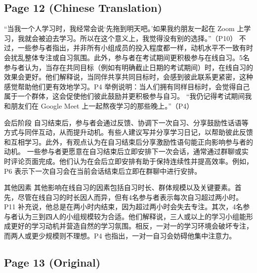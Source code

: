 \documentclass[12pt]{ctexart}
\begin{document}
\subsection*{Page 12 (Chinese Translation)}

“当我一个人学习时，我经常会说‘先拖到明天吧。’如果我约朋友一起在 Zoom 上学习，我就会被迫去学习。所以在这个意义上，我觉得没有别的选择。”（P10）
不过，一些参与者指出，并非所有小组成员的投入程度都一样，动机水平不一致有时会扰乱整体专注或自习氛围。此外，参与者在考试期间更积极参与在线自习。5名参与者认为，当存在共同目标（例如有明确截止日期的考试期间）时，在线自习的效果会更好。他们解释说，当同伴共享共同目标时，会感到彼此联系更紧密，这种感觉帮助他们更有效地学习。P4 举例说明：当人们拥有同样目标时，会觉得自己属于一个群体，这会促使他们彼此鼓励并更积极参与自习。
“我仍记得考试期间我和朋友们在 Google Meet 上一起熬夜学习的那些晚上。”（P4）

会后阶段
自习结束后，参与者会通过反馈、协调下一次自习、分享鼓励性话语等方式与同伴互动，从而提升动机。有些人建议写并分享学习日记，以帮助彼此反馈和互相学习。此外，有观点认为在自习结束后分享激励性语句能正向影响参与者的动机。
一些参与者更愿意在自习结束后立即安排下一次会话，通常通过群聊或实时评论页面完成。他们认为在会后立即安排有助于保持连续性并提高效率。例如，P6 表示下一次自习会在当前会话结束后立即在群聊中进行安排。

其他因素
其他影响在线自习的因素包括自习时长、群体规模以及关键要素。首先，尽管在线自习的时长因人而异，但有4名参与者表示每次自习超过两小时。P11 补充说，他总是在两小时内结束，因为超过两小时会失去专注。其次，4名参与者认为三到四人的小组规模较为合适。他们解释说，三人或以上的学习小组能形成更好的学习动机并营造自然的学习氛围。相反，一对一的学习环境会破坏专注，而两人或更少规模则不理想。P4 也指出，一对一自习会妨碍他集中注意力。

\subsection*{Page 13 (Original)}
\end{document}
